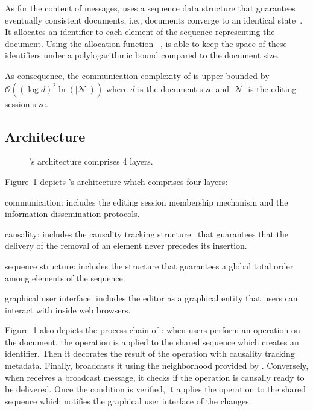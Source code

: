 As for the content of messages, \CRATE uses a sequence data structure
that guarantees eventually consistent documents, i.e., documents converge to an
identical state~\cite{bailis2013eventual}. It allocates an identifier to each
element of the sequence representing the document. Using the allocation function
\LSEQ~\cite{nedelec2013lseq}, \CRATE is able to keep the space of these
identifiers under a polylogarithmic bound compared to the document size.

As consequence, the communication complexity of \CRATE is upper-bounded by
$\mathcal{O}((\log d)^2\ln(|\mathcal{N}|))$ where $d$ is the document size and
$|\mathcal{N}|$ is the editing session size.

\subsection{Architecture}

\begin{figure}
  \centering
  
  \caption{\label{fig:architecture}\CRATE's architecture comprises 4
    layers.}
\end{figure}

Figure~\ref{fig:architecture} depicts \CRATE's architecture which comprises four
layers:
\begin{inparaenum}[(i)]
\item communication: includes the editing session membership mechanism and the
  information dissemination protocols.
\item causality: includes the causality tracking
  structure~\cite{malkhi2007concise} that guarantees that the delivery of the
  removal of an element never precedes its insertion.
\item sequence structure: includes the structure that guarantees a global
  total order among elements of the sequence.
\item graphical user interface: includes the editor as a graphical entity that
  users can interact with inside web browsers.
\end{inparaenum}
Figure~\ref{fig:architecture} also depicts the process chain of \CRATE: when
users perform an operation on the document, the operation is applied to the
shared sequence which creates an \LSEQ identifier. Then it decorates the result
of the operation with causality tracking metadata. Finally, \CRATE broadcasts it
using the neighborhood provided by \SPRAY.  Conversely, when \CRATE receives a
broadcast message, it checks if the operation is causally ready to be
delivered. Once the condition is verified, it applies the operation to the
shared sequence which notifies the graphical user interface of the changes.

